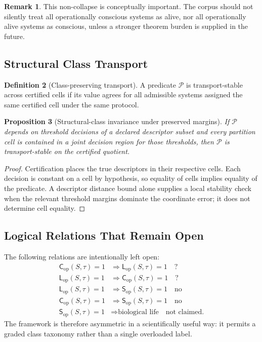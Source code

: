 \documentclass[11pt,a4paper]{article}
\newtheorem{proposition}{Proposition}[section]
\theoremstyle{definition}
\newtheorem{definition}[proposition]{Definition}
\newtheorem{remark}[proposition]{Remark}
\newcommand{\Cop}{\mathsf{C}_{\mathrm{op}}}
\newcommand{\Lop}{\mathsf{L}_{\mathrm{op}}}
\newcommand{\Subop}{\mathsf{S}_{\mathrm{op}}}
\begin{document}
\begin{remark}
This non-collapse is conceptually important. The corpus should not silently treat all operationally conscious systems as alive, nor all operationally alive systems as conscious, unless a stronger theorem burden is supplied in the future.
\end{remark}

\subsection{Structural Class Transport}
\begin{definition}[Class-preserving transport]
A predicate $\mathcal P$ is transport-stable across certified cells if its value agrees for all admissible systems assigned the same certified cell under the same protocol.
\end{definition}

\begin{proposition}[Structural-class invariance under preserved margins]
If $\mathcal P$ depends on threshold decisions of a declared descriptor subset and every partition cell is contained in a joint decision region for those thresholds, then $\mathcal P$ is transport-stable on the certified quotient.
\end{proposition}

\begin{proof}
Certification places the true descriptors in their respective cells. Each decision is constant on a cell by hypothesis, so equality of cells implies equality of the predicate. A descriptor distance bound alone supplies a local stability check when the relevant threshold margins dominate the coordinate error; it does not determine cell equality.
\end{proof}

\subsection{Logical Relations That Remain Open}
The following relations are intentionally left open:
\begin{align*}
\Cop(S,\tau)=1 &\Rightarrow \Lop(S,\tau)=1 \quad ?\\
\Lop(S,\tau)=1 &\Rightarrow \Cop(S,\tau)=1 \quad ?\\
\Lop(S,\tau)=1 &\Rightarrow \Subop(S,\tau)=1 \quad \text{no}\\
\Cop(S,\tau)=1 &\Rightarrow \Subop(S,\tau)=1 \quad \text{no}\\
\Subop(S,\tau)=1 &\Rightarrow \text{biological life} \quad \text{not claimed.}
\end{align*}
The framework is therefore asymmetric in a scientifically useful way: it permits a graded class taxonomy rather than a single overloaded label.
\end{document}

